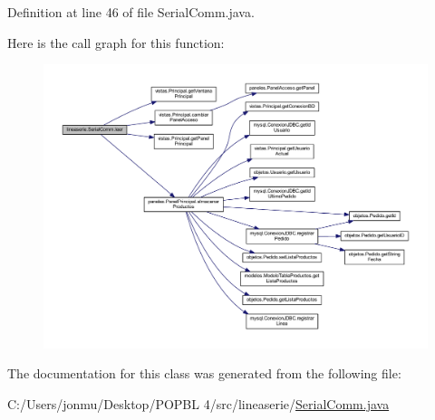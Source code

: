 Definition at line 46 of file Serial\+Comm.\+java.

Here is the call graph for this function\+:
\nopagebreak
\begin{figure}[H]
\begin{center}
\leavevmode
\includegraphics[width=350pt]{classlineaserie_1_1_serial_comm_a9e5dc899a435cb7bbd14c50af1e69a9e_cgraph}
\end{center}
\end{figure}


The documentation for this class was generated from the following file\+:\begin{DoxyCompactItemize}
\item 
C\+:/\+Users/jonmu/\+Desktop/\+P\+O\+P\+B\+L 4/src/lineaserie/\mbox{\hyperlink{_serial_comm_8java}{Serial\+Comm.\+java}}\end{DoxyCompactItemize}
